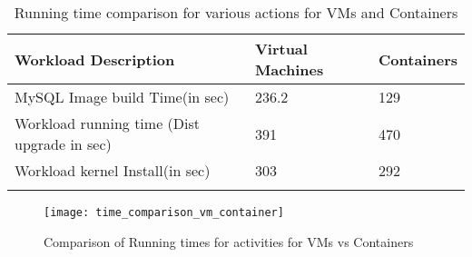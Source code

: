 \newpage
\begin{longtable}[t!]{|p{}|p{}|p{}|}
\hline\hline
\textbf{Workload Description}&\textbf{Virtual Machines}&\textbf{Containers}\\
\hline\hline
\hline
MySQL Image build Time(in sec)&236.2&129\\
\hline
Workload running time (Dist upgrade in sec)&391&470\\
\hline
Workload kernel Install(in sec)&303&292\\
\hline
\hline\hline

\label{tab:tab5}
\caption{Running time comparison for various actions for VMs and Containers \cite{sharma16}}
\end{longtable}




\begin{figure}[h!]
    \centering
    \texttt{[image: time\_comparison\_vm\_container]}
    \label{fig:13}
    \caption{Comparison of Running times for activities for VMs vs Containers \protect\cite{mach17}}
\end{figure}
